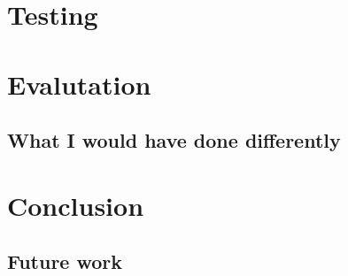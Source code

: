 \documentclass[10pt, titlepage]{article}
\begin{document}
\section{Testing}

\section{Evalutation}
\subsection{What I would have done differently}

\section{Conclusion}
\subsection{Future work}
\end{document}
